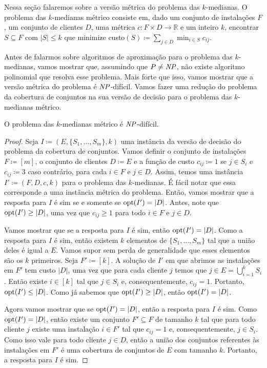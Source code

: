 Nessa seção falaremos sobre a versão métrica do problema das $k$-medianas. 
O problema das $k$-medianas métrico consiste em, dado um conjunto de instalações $F$, um conjunto de clientes $D$, uma métrica $c : F \times D \rightarrow \mathbb{R}$ e um inteiro $k$, encontrar $S \subseteq F$ com $|S| \leq k$ que minimize custo$(S) \coloneqq \sum_{j \in D} \min_{i \in S} c_{ij}$.

Antes de falarmos sobre algoritmos de aproximação para o problema das $k$-medianas, vamos mostrar que, assumindo que $P \neq \mathit{NP}$, não existe algoritmo polinomial que resolva esse problema. Mais forte que isso, vamos mostrar que a versão métrica do problema é $\mathit{NP}$-difícil. Vamos fazer uma redução do problema da cobertura de conjuntos na sua versão de decisão para o problema das $k$-medianas métrico.

\begin{theorem}
O problema das $k$-medianas métrico é $\mathit{NP}$-difícil.
\end{theorem}
\begin{proof}
Seja $I \coloneqq (E,\{S_1,\ldots,S_m\},k)$ uma instância da versão de decisão do problema da cobertura de conjuntos. Vamos definir o conjunto de instalações $F \coloneqq [m]$, o conjunto de clientes $D \coloneqq E$ e a função de custo $c_{ij} \coloneqq 1$ se $j \in S_i$ e $c_{ij} \coloneqq 3$ caso contrário, para cada $i \in F$ e $j \in D$. Assim, temos uma instância $I' \coloneqq (F,D,c,k)$ para o problema das $k$-medianas. É fácil notar que essa corresponde a uma instância métrica do problema. Então, vamos mostrar que a resposta para $I$ é sim se e somente se $\mathrm{opt}(I') = |D|$. Antes, note que $\mathrm{opt}(I') \geq |D|$, uma vez que $c_{ij} \geq 1$ para todo $i \in F$ e $j\in D$.

Vamos mostrar que se a resposta para $I$ é sim, então $\mathrm{opt}(I') = |D|$. Como a resposta para $I$ é sim, então existem $k$ elementos de $\{S_1,\ldots,S_m\}$ tal que a união deles é igual a $E$. Vamos supor sem perda de generalidade que esses elementos são os $k$ primeiros. Seja $F' \coloneqq [k]$. A solução de $I'$ em que abrimos as instalações em $F'$ tem custo $|D|$, uma vez que para cada cliente $j$ temos que $j \in E = \bigcup_{i= 1}^k S_i$. Então existe $i \in [k]$ tal que $j \in S_i$ e, consequentemente, $c_{ij} = 1$. Portanto, $\mathrm{opt}(I') \leq |D|$. Como já sabemos que $\mathrm{opt}(I') \geq |D|$, então $\mathrm{opt}(I') = |D|$.

Agora vamos mostrar que se $\mathrm{opt}(I') = |D|$, então a resposta para $I$ é sim. Como $\mathrm{opt}(I') = |D|$, então existe um conjunto $F' \subseteq F$ de tamanho $k$ tal que para todo cliente $j$ existe uma instalação $i \in F'$ tal que $c_{ij} = 1$ e, consequentemente, $j \in S_i$. Como isso vale para todo cliente $j \in D$, então a união dos conjuntos referentes às instalações em $F'$ é uma cobertura de conjuntos de $E$ com tamanho $k$. Portanto, a resposta para $I$ é sim.
\end{proof}